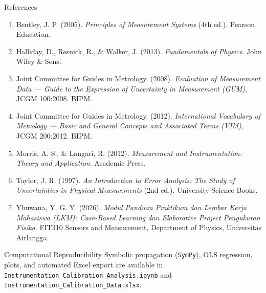 \documentclass[aspectratio=169,10pt]{beamer}
\newcommand{\xs}{\fontsize{7.1}{9}\selectfont}
\begin{document}
\begin{frame}{References}
\xs
\begin{enumerate}
\item Bentley, J. P. (2005). \emph{Principles of Measurement Systems} (4th ed.). Pearson Education.
\item Halliday, D., Resnick, R., \& Walker, J. (2013). \emph{Fundamentals of Physics}. John Wiley \& Sons.
\item Joint Committee for Guides in Metrology. (2008). \emph{Evaluation of Measurement Data --- Guide to the Expression of Uncertainty in Measurement (GUM)}, JCGM 100:2008. BIPM.
\item Joint Committee for Guides in Metrology. (2012). \emph{International Vocabulary of Metrology --- Basic and General Concepts and Associated Terms (VIM)}, JCGM 200:2012. BIPM.
\item Morris, A. S., \& Langari, R. (2012). \emph{Measurement and Instrumentation: Theory and Application}. Academic Press.
\item Taylor, J. R. (1997). \emph{An Introduction to Error Analysis: The Study of Uncertainties in Physical Measurements} (2nd ed.). University Science Books.
\item Yhuwana, Y. G. Y. (2026). \emph{Modul Panduan Praktikum dan Lembar Kerja Mahasiswa (LKM): Case-Based Learning dan Elaborative Project Pengukuran Fisika}. FIT310 Sensors and Measurement, Department of Physics, Universitas Airlangga.
\end{enumerate}
\vspace{2mm}
\begin{exampleblock}{Computational Reproducibility}\xs
Symbolic propagation (\texttt{SymPy}), OLS regression, plots, and automated Excel export are available in \texttt{Instrumentation\_Calibration\_Analysis.ipynb} and \texttt{Instrumentation\_Calibration\_Data.xlsx}.
\end{exampleblock}
\end{frame}
\end{document}
